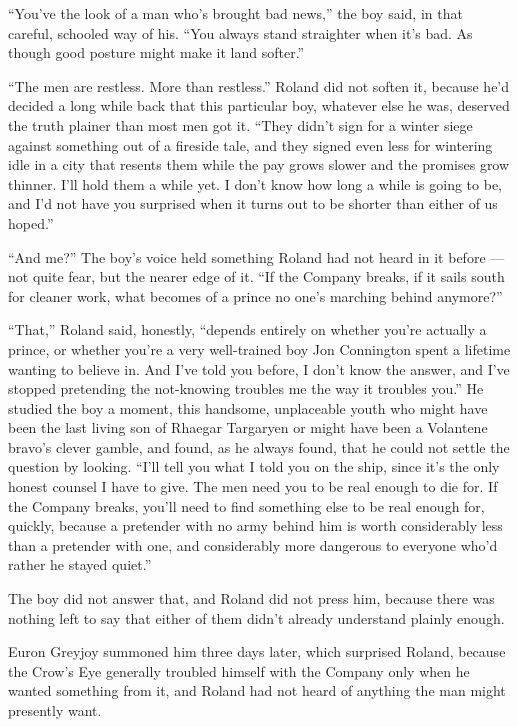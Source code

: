 “You’ve the look of a man who’s brought bad news,” the boy said, in that careful, schooled way of his. “You always stand straighter when it’s bad. As though good posture might make it land softer.”

“The men are restless. More than restless.” Roland did not soften it, because he’d decided a long while back that this particular boy, whatever else he was, deserved the truth plainer than most men got it. “They didn’t sign for a winter siege against something out of a fireside tale, and they signed even less for wintering idle in a city that resents them while the pay grows slower and the promises grow thinner. I’ll hold them a while yet. I don’t know how long a while is going to be, and I’d not have you surprised when it turns out to be shorter than either of us hoped.”

“And me?” The boy’s voice held something Roland had not heard in it before — not quite fear, but the nearer edge of it. “If the Company breaks, if it sails south for cleaner work, what becomes of a prince no one’s marching behind anymore?”

“That,” Roland said, honestly, “depends entirely on whether you’re actually a prince, or whether you’re a very well-trained boy Jon Connington spent a lifetime wanting to believe in. And I’ve told you before, I don’t know the answer, and I’ve stopped pretending the not-knowing troubles me the way it troubles you.” He studied the boy a moment, this handsome, unplaceable youth who might have been the last living son of Rhaegar Targaryen or might have been a Volantene bravo’s clever gamble, and found, as he always found, that he could not settle the question by looking. “I’ll tell you what I told you on the ship, since it’s the only honest counsel I have to give. The men need you to be real enough to die for. If the Company breaks, you’ll need to find something else to be real enough for, quickly, because a pretender with no army behind him is worth considerably less than a pretender with one, and considerably more dangerous to everyone who’d rather he stayed quiet.”

The boy did not answer that, and Roland did not press him, because there was nothing left to say that either of them didn’t already understand plainly enough.

\sceneBreak

Euron Greyjoy summoned him three days later, which surprised Roland, because the Crow’s Eye generally troubled himself with the Company only when he wanted something from it, and Roland had not heard of anything the man might presently want.


